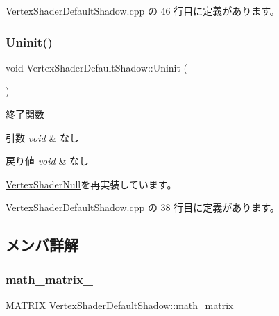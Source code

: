 Vertex\+Shader\+Default\+Shadow.\+cpp の 46 行目に定義があります。

\mbox{\label{class_vertex_shader_default_shadow_aee16a04757ab1698d76bdca43834c633}} 
\subsubsection{\texorpdfstring{Uninit()}{Uninit()}}
{\footnotesize\ttfamily void Vertex\+Shader\+Default\+Shadow\+::\+Uninit (\begin{DoxyParamCaption}{ }\end{DoxyParamCaption})\hspace{0.3cm}{\ttfamily [virtual]}}



終了関数 


\begin{DoxyParams}{引数}
{\em void} & なし \\
\hline
\end{DoxyParams}

\begin{DoxyRetVals}{戻り値}
{\em void} & なし \\
\hline
\end{DoxyRetVals}


\mbox{\hyperlink{class_vertex_shader_null_adf758f295d2803c6d8bd7e05e461abec}{Vertex\+Shader\+Null}}を再実装しています。



 Vertex\+Shader\+Default\+Shadow.\+cpp の 38 行目に定義があります。



\subsection{メンバ詳解}
\mbox{\label{class_vertex_shader_default_shadow_a9f8337d5931d2c353615f706da89694d}} 
\subsubsection{\texorpdfstring{math\+\_\+matrix\+\_\+}{math\_matrix\_}}
{\footnotesize\ttfamily \mbox{\hyperlink{_matrix_8h_a032295cd9fb1b711757c90667278e744}{M\+A\+T\+R\+IX}} Vertex\+Shader\+Default\+Shadow\+::math\+\_\+matrix\+\_\+\hspace{0.3cm}{\ttfamily [private]}}



